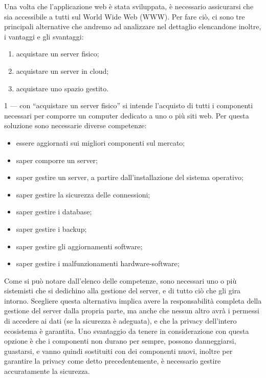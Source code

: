 \documentclass[12pt,a4paper]{article}
\begin{document}
Una volta che l’applicazione web è stata sviluppata, è necessario assicurarsi che sia accessibile a tutti sul World Wide Web (WWW). Per fare ciò, ci sono tre principali alternative che andremo ad analizzare nel dettaglio elencandone inoltre, i vantaggi e gli svantaggi:
\begin{enumerate}
    \item acquistare un server fisico;
    \item acquistare un server in cloud;
    \item acquistare uno spazio gestito.
\end{enumerate}
1 --- con “acquistare un server fisico” si intende l’acquisto di tutti i componenti necessari per comporre un computer dedicato a uno o più siti web. Per questa soluzione sono necessarie diverse competenze:

\begin{itemize}
    \item essere aggiornati sui migliori componenti sul mercato;
    \item saper comporre un server;
    \item saper gestire un server, a partire dall’installazione del sistema operativo;
    \item saper gestire la sicurezza delle connessioni;
    \item saper gestire i database;
    \item saper gestire i backup;
    \item saper gestire gli aggiornamenti software;
    \item saper gestire i malfunzionamenti hardware-software;
\end{itemize}

Come si può notare dall’elenco delle competenze, sono necessari uno o più sistemisti che si dedichino alla gestione del server, e di tutto ciò che gli gira intorno.
Scegliere questa alternativa implica avere la responsabilità completa della gestione del server dalla propria parte, ma anche che nessun altro avrà i permessi di accedere ai dati (se la sicurezza è adeguata), e che la privacy dell’intero ecosistema è garantita. Uno svantaggio da tenere in considerazione con questa opzione è che i componenti non durano per sempre, possono danneggiarsi, guastarsi, e vanno quindi sostituiti con dei componenti nuovi, inoltre per garantire la privacy come detto precedentemente, è necessario gestire accuratamente la sicurezza.
\end{document}
